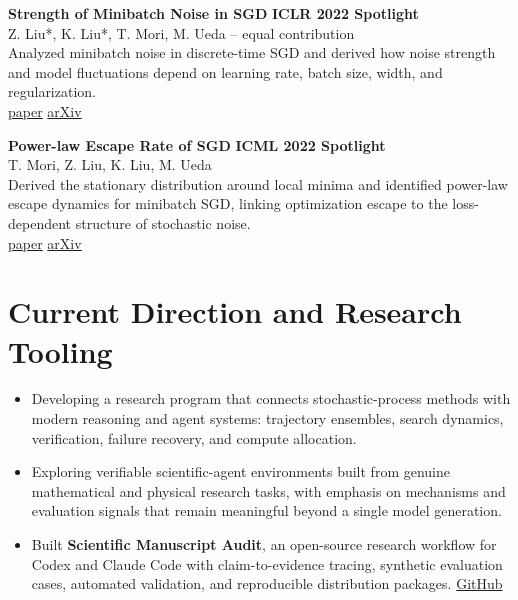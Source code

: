 \documentclass[10pt,a4paper]{article}
\newcommand{\where}[1]{\textcolor{muted}{#1}}
\newcommand{\link}[2]{\href{#1}{#2}}
\begin{document}
\vspace{2pt}
\textbf{Strength of Minibatch Noise in SGD} \hfill \textbf{ICLR 2022 Spotlight}\\
\where{Z. Liu*, K. Liu*, T. Mori, M. Ueda -- equal contribution}\\[-1pt]
Analyzed minibatch noise in discrete-time SGD and derived how noise strength and model fluctuations depend on learning rate, batch size, width, and regularization.\\[-1pt]
\link{https://openreview.net/forum?id=uorVGbWV5sw}{paper} \;\; \link{https://arxiv.org/abs/2102.05375}{arXiv}

\vspace{2pt}
\textbf{Power-law Escape Rate of SGD} \hfill \textbf{ICML 2022 Spotlight}\\
\where{T. Mori, Z. Liu, K. Liu, M. Ueda}\\[-1pt]
Derived the stationary distribution around local minima and identified power-law escape dynamics for minibatch SGD, linking optimization escape to the loss-dependent structure of stochastic noise.\\[-1pt]
\link{https://proceedings.mlr.press/v162/mori22a.html}{paper} \;\; \link{https://arxiv.org/abs/2105.09557}{arXiv}

\section*{Current Direction and Research Tooling}
\begin{itemize}
  \item Developing a research program that connects stochastic-process methods with modern reasoning and agent systems: trajectory ensembles, search dynamics, verification, failure recovery, and compute allocation.
  \item Exploring verifiable scientific-agent environments built from genuine mathematical and physical research tasks, with emphasis on mechanisms and evaluation signals that remain meaningful beyond a single model generation.
  \item Built \textbf{Scientific Manuscript Audit}, an open-source research workflow for Codex and Claude Code with claim-to-evidence tracing, synthetic evaluation cases, automated validation, and reproducible distribution packages. \link{https://github.com/KangqiaoLiu/scientific-manuscript-audit}{GitHub}
\end{itemize}
\end{document}
